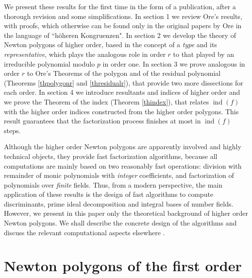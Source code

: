 \documentclass{amsart}
\def\op{\operatorname}
\def\ind{\op{ind}}
\begin{document}
We present these results for the first time in the form of a publication, after a thorough revision and some simplifications.
In section 1 we review Ore's results, with proofs, which otherwise can be found only in the original papers by Ore in the language of ``h\"oheren Kongruenzen". In section 2     
we develop the theory of Newton polygons of higher order, based in the concept of a \emph{type} and its \emph{representative}, which plays the analogous role in order $r$ to that played by an irreducible polynomial modulo $p$ in order one. In section 3 we prove analogous in order $r$ to Ore's Theorems of the polygon and of the residual polynomial (Theorems \ref{thpolygonr} and \ref{thresidualr}), that provide two more dissections for each order. In section 4 we introduce resultants and indices of higher order and we prove the Theorem of the index (Theorem \ref{thindex}), that relates $\ind(f)$ with the higher order indices constructed from the higher order polygons. This result guarantees that the factorization process finishes at most in  $\ind(f)$ steps.  

Although the higher order Newton polygons are apparently involved and highly technical objects, they provide fast factorization algorithms, because all computations are mainly based on two reasonably fast operations: division with remainder of monic polynomials with \emph{integer} coefficients, and factorization of polynomials over \emph{finite} fields. Thus, from a modern perspective, the main application of these results is the design of fast algorithms to compute discriminants, prime ideal decomposition and integral bases of number fields. However, we present in this paper only the theoretical background of higher order Newton polygons. We shall describe the concrete design of the algorithms and discuss the relevant computational aspects elsewhere \cite{gmna,gmnb}.    

\tableofcontents

\section{Newton polygons of the first order}\label{secNP}
\end{document}
